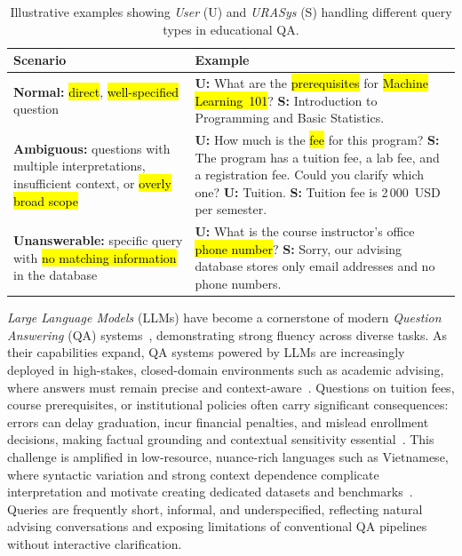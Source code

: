 \documentclass[11pt]{article}
\newcommand{\hlb}[1]{\sethlcolor{NavyBlue!10}\hl{#1}}   %
\newcommand{\hlg}[1]{\sethlcolor{OliveGreen!10}\hl{#1}}    %
\newcommand{\hlr}[1]{\sethlcolor{BrickRed!10}\hl{#1}}     %
\begin{document}
\begin{table}[t]
\centering
\caption{Illustrative examples showing \textit{User} (U) and \textit{URASys} (S) handling different query types in educational QA.}
\begin{tabular}{@{}p{}p{}@{}}
\toprule
\textbf{Scenario} & \textbf{Example} \\
\midrule

\textbf{Normal:} \hlg{direct}, \hlg{well-specified} question &
\textbf{U:} What are the \hlg{prerequisites} for \hlg{Machine Learning~101}?\newline
\textbf{S:} Introduction to Programming and Basic Statistics. \\
\addlinespace[5pt]

\textbf{Ambiguous:} questions with multiple interpretations, insufficient context, or \hlb{overly broad scope} \cite{wang-etal-2023-know}&
\textbf{U:} How much is the \hlb{fee} for this program?\newline
\textbf{S:} The program has a tuition fee, a lab fee, and a registration fee. Could you clarify which one?\newline
\textbf{U:} Tuition.\newline
\textbf{S:} Tuition fee is 2\,000~USD per semester. \\
\addlinespace[5pt]

\textbf{Unanswerable:} specific query with \hlr{no matching information} in the database &
\textbf{U:} What is the course instructor’s office \hlr{phone number}?\newline
\textbf{S:} Sorry, our advising database stores only email addresses and no phone numbers. \\
\bottomrule
\end{tabular}
\label{tab:example}
\end{table}

\textit{Large Language Models} (LLMs) have become a cornerstone of modern \textit{Question Answering} (QA) systems~\cite{RASOOL2024100083}, demonstrating strong fluency across diverse tasks. As their capabilities expand, QA systems powered by LLMs are increasingly deployed in high-stakes, closed-domain environments such as academic advising, where answers must remain precise and context-aware~\cite{10433480}. Questions on tuition fees, course prerequisites, or institutional policies often carry significant consequences: errors can delay graduation, incur financial penalties, and mislead enrollment decisions, making factual grounding and contextual sensitivity essential~\cite{10.1007/978-981-96-4285-4_7}. This challenge is amplified in low-resource, nuance-rich languages such as Vietnamese, where syntactic variation and strong context dependence complicate interpretation and motivate creating dedicated datasets and benchmarks~\cite{10.1145/3675781}. Queries are frequently short, informal, and underspecified, reflecting natural advising conversations and exposing limitations of conventional QA pipelines without interactive clarification.
\end{document}
